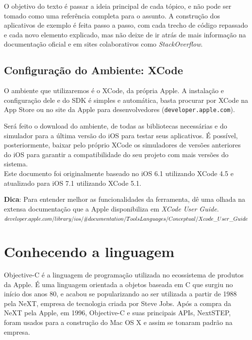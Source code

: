 \documentclass[a4paper,12pt,brazil,oneside]{book}
\begin{document}
O objetivo do texto é passar a ideia principal de cada tópico, e não pode ser tomado como uma referência completa para o assunto. A construção dos aplicativos de exemplo é feita passo a passo, com cada trecho de código repassado e cada novo elemento explicado, mas não deixe de ir atrás de mais informação na documentação oficial e em sites colaborativos como \emph{StackOverflow}.


\section{Configuração do Ambiente: XCode}

O ambiente que utilizaremos é o XCode, da própria Apple. A instalação e configuração dele e do SDK é simples e automática, basta procurar por XCode na App Store ou no site da Apple para desenvolvedores (\texttt{developer.apple.com}).

Será feito o download do ambiente, de todas as bibliotecas necessárias e do simulador para a última versão do iOS para testar seus aplicativos. É possível, posteriormente, baixar pelo próprio XCode os simuladores de versões anteriores do iOS para garantir a compatibilidade do seu projeto com mais versões do sistema.\\

Este documento foi originalmente baseado no iOS 6.1 utilizando XCode 4.5 e atualizado para iOS 7.1 utilizando XCode 5.1.

\begin{framed}
\textbf{Dica}: Para entender melhor as funcionalidades da ferramenta, dê uma olhada na extensa documentação que a Apple disponibiliza em 
\textit{XCode User Guide.\\
\(developer.apple.com/library/ios/\#documentation/ToolsLanguages/Conceptual/\\Xcode\_User\_Guide\)}
\end{framed}

\chapter{Conhecendo a linguagem}



Objective-C é a linguagem de programação utilizada no ecossistema de produtos da Apple. É uma linguagem orientada a objetos baseada em C que surgiu no início dos anos 80, e acabou se popularizando ao ser utilizada a partir de 1988 pela NeXT, empresa de tecnologia criada por Steve Jobs. Após a compra da NeXT pela Apple, em 1996, Objective-C e suas principais APIs, NextSTEP, foram usados para a construção do Mac OS X e assim se tonaram padrão na empresa.
\end{document}

